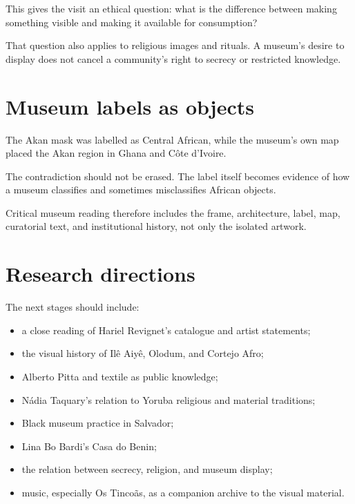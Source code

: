 This gives the visit an ethical question:
what is the difference between making
something visible and making it available
for consumption?

That question also applies to religious
images and rituals.  A museum's desire to
display does not cancel a community's
right to secrecy or restricted knowledge.

\section{Museum labels as objects}
\label{section-art-museum-labels}

The Akan mask was labelled as Central
African, while the museum's own map placed
the Akan region in Ghana and C\^ote d'Ivoire.

The contradiction should not be erased.
The label itself becomes evidence of how a
museum classifies and sometimes
misclassifies African objects.

Critical museum reading therefore includes
the frame, architecture, label, map,
curatorial text, and institutional history,
not only the isolated artwork.

\section{Research directions}
\label{section-afro-art-directions}

The next stages should include:

\begin{itemize}
\item a close reading of Hariel Revignet's
catalogue and artist statements;
\item the visual history of Il\^e Aiy\^e,
Olodum, and Cortejo Afro;
\item Alberto Pitta and textile as public
knowledge;
\item N\'adia Taquary's relation to Yoruba
religious and material traditions;
\item Black museum practice in Salvador;
\item Lina Bo Bardi's Casa do Benin;
\item the relation between secrecy,
religion, and museum display;
\item music, especially Os Tinco\~as, as a
companion archive to the visual material.
\end{itemize}





